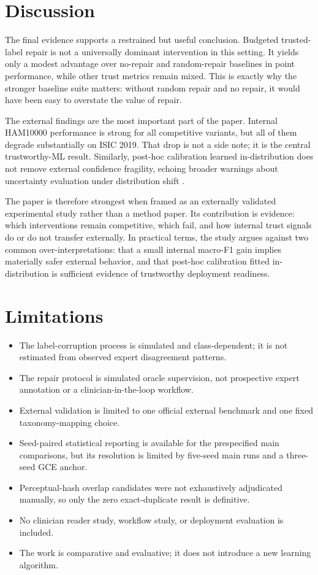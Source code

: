 \documentclass[11pt]{article}
\begin{document}
\section{Discussion}

The final evidence supports a restrained but useful conclusion. Budgeted trusted-label repair is not a universally dominant intervention in this setting. It yields only a modest advantage over no-repair and random-repair baselines in point performance, while other trust metrics remain mixed. This is exactly why the stronger baseline suite matters: without random repair and no repair, it would have been easy to overstate the value of repair.

The external findings are the most important part of the paper. Internal HAM10000 performance is strong for all competitive variants, but all of them degrade substantially on ISIC 2019. That drop is not a side note; it is the central trustworthy-ML result. Similarly, post-hoc calibration learned in-distribution does not remove external confidence fragility, echoing broader warnings about uncertainty evaluation under distribution shift \citep{combalia2022isic2019,ovadia2019uncertainty}.

The paper is therefore strongest when framed as an externally validated experimental study rather than a method paper. Its contribution is evidence: which interventions remain competitive, which fail, and how internal trust signals do or do not transfer externally. In practical terms, the study argues against two common over-interpretations: that a small internal macro-F1 gain implies materially safer external behavior, and that post-hoc calibration fitted in-distribution is sufficient evidence of trustworthy deployment readiness.

\section{Limitations}

\begin{itemize}
  \item The label-corruption process is simulated and class-dependent; it is not estimated from observed expert disagreement patterns.
  \item The repair protocol is simulated oracle supervision, not prospective expert annotation or a clinician-in-the-loop workflow.
  \item External validation is limited to one official external benchmark and one fixed taxonomy-mapping choice.
  \item Seed-paired statistical reporting is available for the prespecified main comparisons, but its resolution is limited by five-seed main runs and a three-seed GCE anchor.
  \item Perceptual-hash overlap candidates were not exhaustively adjudicated manually, so only the zero exact-duplicate result is definitive.
  \item No clinician reader study, workflow study, or deployment evaluation is included.
  \item The work is comparative and evaluative; it does not introduce a new learning algorithm.
\end{itemize}
\end{document}
